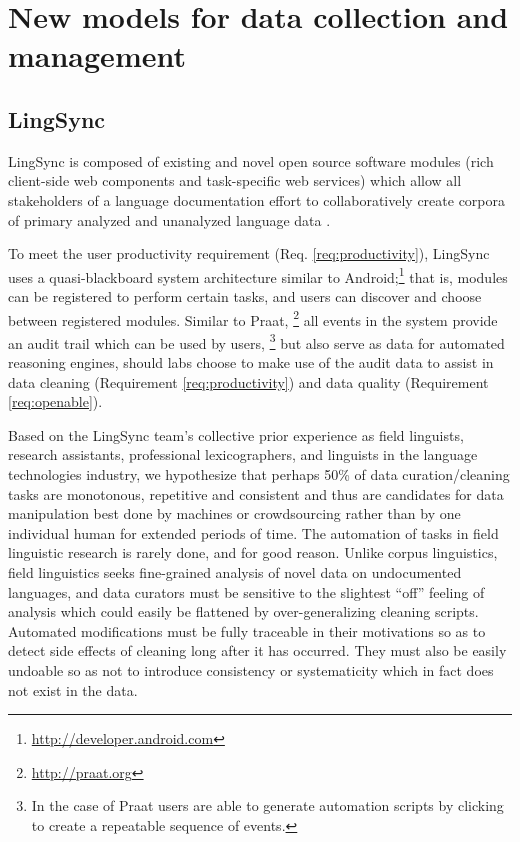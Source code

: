 \documentclass[11pt]{article}
\begin{document}
\section{New models for data collection and management}
\label{sec:lingsync-old}


\subsection{LingSync}\label{sec:lingsync}

LingSync is
composed of existing and novel open source software modules (rich client-side
web components and task-specific web services) which allow all stakeholders of
a language documentation effort to collaboratively create corpora of primary
analyzed and unanalyzed language data \cite{lingsync:2012}.

To meet the user productivity requirement (Req. \autoref{req:productivity}),
LingSync uses a quasi-blackboard system architecture similar to
Android;\footnote{\url{http://developer.android.com}} that is, modules can be
registered to perform certain tasks, and users can discover and choose between
registered modules. Similar to Praat,%
\footnote{\url{http://praat.org}} %
all events in the system provide an audit trail which can be used by users,%
\footnote{In the case of Praat users are able to generate automation scripts by
clicking to create a repeatable sequence of events.}
but also serve as data for automated reasoning engines, should labs choose to
make use of the audit data to assist in data cleaning (Requirement
\autoref{req:productivity}) and data quality (Requirement
\autoref{req:openable}).

Based on the LingSync team's collective prior experience as field linguists,
research assistants, professional lexicographers, and linguists in the language
technologies industry, we hypothesize that perhaps 50\% of data
curation/cleaning tasks are monotonous, repetitive and consistent and thus are
candidates for data manipulation best done by machines or crowdsourcing rather
than by one individual human for extended periods of time.  The automation of
tasks in field linguistic research is rarely done, and for good reason. Unlike
corpus linguistics, field linguistics seeks fine-grained analysis of novel data
on undocumented languages, and data curators must be sensitive to the slightest
``off'' feeling of analysis which could easily be flattened by
over-generalizing cleaning scripts.  Automated modifications must be fully
traceable in their motivations so as to detect side effects of cleaning long
after it has occurred. They must also be easily undoable so as not to introduce
consistency or systematicity which in fact does not exist in the data.
\end{document}
